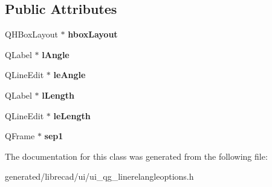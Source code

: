 \subsection*{Public Attributes}
\begin{DoxyCompactItemize}
\item 
\hypertarget{classUi__QG__LineRelAngleOptions_a0214ac06f2323b9fb7079437499f988d}{Q\-H\-Box\-Layout $\ast$ {\bfseries hbox\-Layout}}\label{classUi__QG__LineRelAngleOptions_a0214ac06f2323b9fb7079437499f988d}

\item 
\hypertarget{classUi__QG__LineRelAngleOptions_aad16243b3518ffc720cb09a21dac77bd}{Q\-Label $\ast$ {\bfseries l\-Angle}}\label{classUi__QG__LineRelAngleOptions_aad16243b3518ffc720cb09a21dac77bd}

\item 
\hypertarget{classUi__QG__LineRelAngleOptions_a3831c369ffc191b77fedb7738fef4215}{Q\-Line\-Edit $\ast$ {\bfseries le\-Angle}}\label{classUi__QG__LineRelAngleOptions_a3831c369ffc191b77fedb7738fef4215}

\item 
\hypertarget{classUi__QG__LineRelAngleOptions_ae9667febcbb3f7e06a6b82cae0ec2d3a}{Q\-Label $\ast$ {\bfseries l\-Length}}\label{classUi__QG__LineRelAngleOptions_ae9667febcbb3f7e06a6b82cae0ec2d3a}

\item 
\hypertarget{classUi__QG__LineRelAngleOptions_a3382238bf7d3a5f630cf3e797236ce70}{Q\-Line\-Edit $\ast$ {\bfseries le\-Length}}\label{classUi__QG__LineRelAngleOptions_a3382238bf7d3a5f630cf3e797236ce70}

\item 
\hypertarget{classUi__QG__LineRelAngleOptions_a39ab01a5fc8c59be3e4dd10d3b0fd77e}{Q\-Frame $\ast$ {\bfseries sep1}}\label{classUi__QG__LineRelAngleOptions_a39ab01a5fc8c59be3e4dd10d3b0fd77e}

\end{DoxyCompactItemize}


The documentation for this class was generated from the following file\-:\begin{DoxyCompactItemize}
\item 
generated/librecad/ui/ui\-\_\-qg\-\_\-linerelangleoptions.\-h\end{DoxyCompactItemize}
